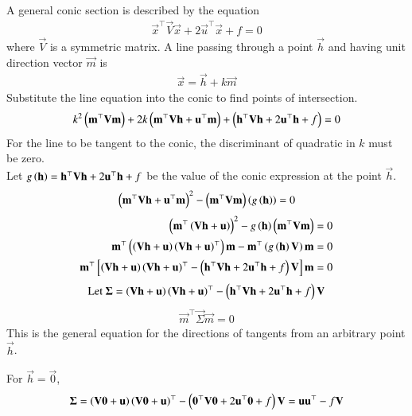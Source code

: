 \documentclass[journal]{IEEEtran}
\begin{document}
A general conic section is described by the equation
\begin{align}
    \vec{x}^\top \vec{V} \vec{x} + 2\vec{u}^\top \vec{x} + f = 0
\end{align}
where $\vec{V}$ is a symmetric matrix. A line passing through a point $\vec{h}$ and having unit direction vector $\vec{m}$ is
\begin{align}
    \vec{x} = \vec{h} + k\vec{m}
\end{align}
Substitute the line equation into the conic to find points of intersection.
\begin{align}
    k^2\left(\mathbf{m}^\top\mathbf{V}\mathbf{m}\right) + 2k\left(\mathbf{m}^\top\mathbf{V}\mathbf{h} + \mathbf{u}^\top\mathbf{m}\right) + \left(\mathbf{h}^\top\mathbf{V}\mathbf{h} + 2\mathbf{u}^\top\mathbf{h} + f\right) = 0
\end{align}
For the line to be tangent to the conic, the discriminant of quadratic in $k$ must be zero. \\
Let $g\left(\mathbf{h}\right) = \mathbf{h}^\top\mathbf{V}\mathbf{h} + 2\mathbf{u}^\top\mathbf{h} + f$ be the value of the conic expression at the point $\vec{h}$.
\begin{align}
    \left(\mathbf{m}^\top\mathbf{V}\mathbf{h} + \mathbf{u}^\top\mathbf{m}\right)^2 - \left(\mathbf{m}^\top\mathbf{V}\mathbf{m}\right)\left(g\left(\mathbf{h}\right)\right) = 0
\end{align}
\begin{align}
    \left(\mathbf{m}^\top \left(\mathbf{V}\mathbf{h} + \mathbf{u}\right)\right)^2 - g\left(\mathbf{h}\right)\left(\mathbf{m}^\top\mathbf{V}\mathbf{m}\right) &= 0 \\
    \mathbf{m}^\top \left(\left(\mathbf{V}\mathbf{h} + \mathbf{u}\right)\left(\mathbf{V}\mathbf{h} + \mathbf{u}\right)^\top\right) \mathbf{m} - \mathbf{m}^\top \left(g\left(\mathbf{h}\right)\mathbf{V}\right) \mathbf{m} &= 0 \\
    \mathbf{m}^\top {}\left[\left(\mathbf{V}\mathbf{h} + \mathbf{u}\right)\left(\mathbf{V}\mathbf{h} + \mathbf{u}\right)^\top - \left(\mathbf{h}^\top\mathbf{V}\mathbf{h} + 2\mathbf{u}^\top\mathbf{h} + f\right)\mathbf{V}\right] \mathbf{m} &= 0
\end{align}
\begin{align}
    \text{Let }\mathbf{\Sigma} = \left(\mathbf{V}\mathbf{h} + \mathbf{u}\right)\left(\mathbf{V}\mathbf{h} + \mathbf{u}\right)^\top - \left(\mathbf{h}^\top\mathbf{V}\mathbf{h} + 2\mathbf{u}^\top\mathbf{h} + f\right)\mathbf{V} \label{eq:sigma_notation}
\end{align}
\begin{align}
    \vec{m}^\top \vec{\Sigma} \vec{m} = 0 \label{eq:sigma}
\end{align}
This is the general equation for the directions of tangents from an arbitrary point $\vec{h}$.

For $\vec{h} = \vec{0}$,
\begin{align}
    \mathbf{\Sigma} = \left(\mathbf{V}\mathbf{0} + \mathbf{u}\right)\left(\mathbf{V}\mathbf{0} + \mathbf{u}\right)^\top - \left(\mathbf{0}^\top\mathbf{V}\mathbf{0} + 2\mathbf{u}^\top\mathbf{0} + f\right)\mathbf{V} = \mathbf{u}\mathbf{u}^\top - f\mathbf{V}
\end{align}
\end{document}
